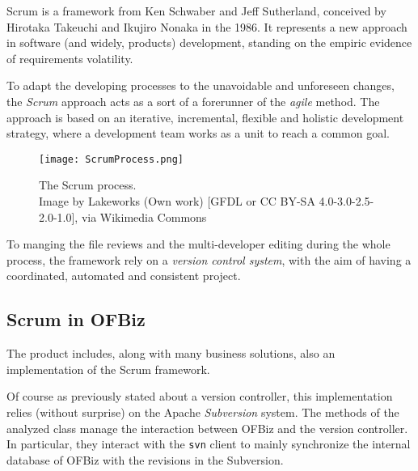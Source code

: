 \documentclass{scrreprt}
\begin{document}
Scrum is a framework from Ken Schwaber and Jeff Sutherland, conceived by Hirotaka Takeuchi and Ikujiro Nonaka in the 1986. It represents a new approach in software (and widely, products) development, standing on the empiric evidence of requirements volatility.

To adapt the developing processes to the unavoidable and unforeseen changes, the \emph{Scrum} approach acts as a sort of  a forerunner of the \emph{agile} method. The approach is based on an iterative, incremental, flexible and holistic development strategy, where a development team works as a unit to reach a common goal.

\begin{figure}[h]
\centering
\texttt{[image: ScrumProcess.png]}
\caption{The Scrum process.\\Image by Lakeworks (Own work) [GFDL or CC BY-SA 4.0-3.0-2.5-2.0-1.0], via Wikimedia Commons}\label{fig:1}
\end{figure}



To manging the file reviews and the multi-developer editing during the whole process, the framework rely on a \emph{version control system}, with the aim of having a coordinated, automated and consistent project.

\subsection{Scrum in OFBiz}

The product includes, along with many business solutions, also an implementation of the Scrum framework.

Of course as previously stated about a version controller, this implementation relies (without surprise) on the Apache \emph{Subversion} system.
The methods of the analyzed class manage the interaction between OFBiz and the version controller.
In particular, they interact with the \texttt{svn} client to mainly synchronize the internal database of OFBiz with the revisions in the Subversion.
\end{document}
